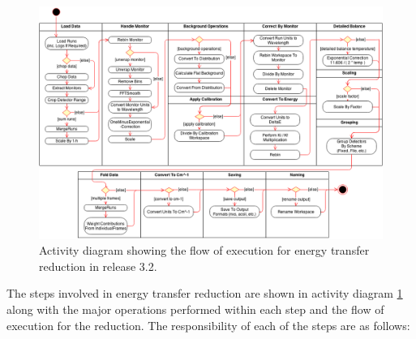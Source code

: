 \documentclass[paper=a4, fontsize=11pt]{scrartcl}	%
\numberwithin{equation}{section}															%
\numberwithin{figure}{section}																%
\numberwithin{table}{section}																%
\begin{document}
\begin{figure}[H]
\centering
\includegraphics[width=1\textwidth]{img/uml/activity_diagrams/EnergyTransfer_activity.png}
\caption{Activity diagram showing the flow of execution for energy transfer reduction in release 3.2.}
\label{fig:c2e-energy-transfer-activity-diagram}
\end{figure}

The steps involved in energy transfer reduction are shown in activity diagram \ref{fig:c2e-energy-transfer-activity-diagram} along with the major operations performed within each step and the flow of execution for the reduction. The responsibility of each of the steps are as follows:
\end{document}
